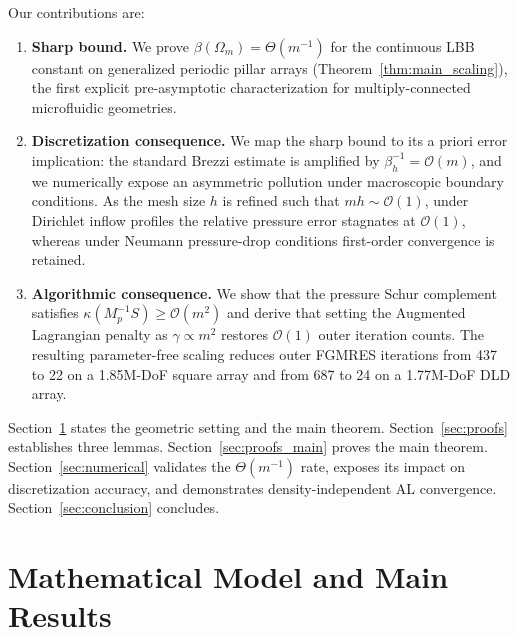 \documentclass{elsarticle}
\begin{document}
Our contributions are:
\begin{enumerate}
    \item \textbf{Sharp bound.} We prove $\beta(\Omega_m) = \Theta(m^{-1})$ for the continuous LBB constant on generalized periodic pillar arrays (Theorem~\ref{thm:main_scaling}), the first explicit pre-asymptotic characterization for multiply-connected microfluidic geometries.
    \item \textbf{Discretization consequence.} We map the sharp bound to its a priori error implication: the standard Brezzi estimate is amplified by $\beta_h^{-1} = \mathcal{O}(m)$, and we numerically expose an asymmetric pollution under macroscopic boundary conditions. As the mesh size $h$ is refined such that $mh\sim \mathcal{O}(1) $, under Dirichlet inflow profiles the relative pressure error stagnates at $\mathcal{O}(1)$, whereas under Neumann pressure-drop conditions first-order convergence is retained.
    \item \textbf{Algorithmic consequence.} We show that the pressure Schur complement satisfies $\kappa(M_p^{-1}S) \ge \mathcal{O}(m^2)$ and derive that setting the Augmented Lagrangian penalty as $\gamma \propto m^2$ restores $\mathcal{O}(1)$ outer iteration counts. The resulting parameter-free scaling reduces outer FGMRES iterations from 437 to 22 on a 1.85M-DoF square array and from 687 to 24 on a 1.77M-DoF DLD array.
\end{enumerate}

Section~\ref{sec:problem_main_results} states the geometric setting and the main theorem. Section~\ref{sec:proofs} establishes three lemmas. Section~\ref{sec:proofs_main} proves the main theorem. Section~\ref{sec:numerical} validates the $\Theta(m^{-1})$ rate, exposes its impact on discretization accuracy, and demonstrates density-independent AL convergence. Section~\ref{sec:conclusion} concludes.


\section{Mathematical Model and Main Results}\label{sec:problem_main_results}
\end{document}

